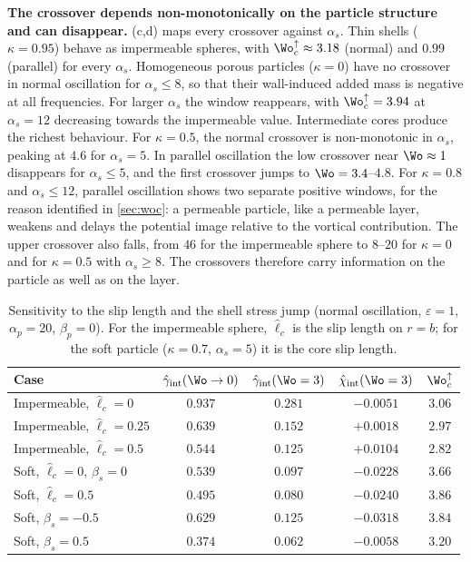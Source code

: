 \textbf{The crossover depends non-monotonically on the particle structure and can disappear.} (c,d) maps
every crossover against $\alpha_s$. Thin shells ($\kappa=0.95$) behave as impermeable spheres, with
$\Wo_c^{\uparrow}\approx3.18$ (normal) and $0.99$ (parallel) for every $\alpha_s$. Homogeneous porous particles
($\kappa=0$) have no crossover in normal oscillation for $\alpha_s\le8$, so that their wall-induced added mass is
negative at all frequencies. For larger $\alpha_s$ the window reappears, with $\Wo_c^{\uparrow}=3.94$ at $\alpha_s=12$
decreasing towards the impermeable value. Intermediate cores produce the richest behaviour. For $\kappa=0.5$, the normal
crossover is non-monotonic in $\alpha_s$, peaking at $4.6$ for $\alpha_s=5$. In parallel oscillation the low crossover
near $\Wo\approx1$ disappears for $\alpha_s\le5$, and the first crossover jumps to $\Wo=3.4$--$4.8$. For $\kappa=0.8$
and $\alpha_s\le12$, parallel oscillation shows two separate positive windows, for the reason identified in
\cref{sec:woc}: a permeable particle, like a permeable layer, weakens and delays the potential image relative to the
vortical contribution. The upper crossover also falls, from
$46$ for the impermeable sphere to $8$--$20$ for $\kappa=0$ and for $\kappa=0.5$ with $\alpha_s\ge8$. The crossovers
therefore carry information on the particle as well as on the layer. 

\begin{table}[t]
\caption{Sensitivity to the slip length and the shell stress jump (normal oscillation, $\varepsilon=1$, $\alpha_p=20$,
$\beta_p=0$). For the impermeable sphere, $\hat\ell_c$ is the slip length on $r=b$; for the soft particle
($\kappa=0.7$, $\alpha_s=5$) it is the core slip length.}
\label{tab:sensitivity}
\begin{ruledtabular}
\begin{tabular}{lcccc}
Case & $\hat\gamma_{\rm int}(\Wo\to0)$ & $\hat\gamma_{\rm int}(\Wo=3)$ & $\hat\chi_{\rm int}(\Wo=3)$ & $\Wo_c^{\uparrow}$\\
\hline
Impermeable, $\hat\ell_c=0$ & $0.937$ & $0.281$ & $-0.0051$ & $3.06$\\
Impermeable, $\hat\ell_c=0.25$ & $0.639$ & $0.152$ & $+0.0018$ & $2.97$\\
Impermeable, $\hat\ell_c=0.5$ & $0.544$ & $0.125$ & $+0.0104$ & $2.82$\\
Soft, $\hat\ell_c=0$, $\beta_s=0$ & $0.539$ & $0.097$ & $-0.0228$ & $3.66$\\
Soft, $\hat\ell_c=0.5$ & $0.495$ & $0.080$ & $-0.0240$ & $3.86$\\
Soft, $\beta_s=-0.5$ & $0.629$ & $0.125$ & $-0.0318$ & $3.84$\\
Soft, $\beta_s=0.5$ & $0.374$ & $0.062$ & $-0.0058$ & $3.20$\\
\end{tabular}
\end{ruledtabular}
\end{table}

